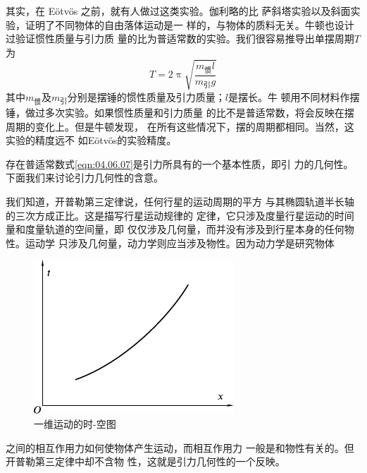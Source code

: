 其实，在 E\"otv\"os 之前，就有人做过这类实验。伽利略的比
萨斜塔实验以及斜面实验，证明了不同物体的自由落体运动是一
样的，与物体的质料无关。牛顿也设计过验证惯性质量与引力质
量的比为普适常数的实验。我们很容易推导出单摆周期$ T $为
\begin{equation*}
  T = 2 \uppi \sqrt{\frac { m _ {\text{惯}} l } { m _ {\text{引}} g }}
\end{equation*}
其中$ m _ {\text{惯}} $及$ m _ {\text{引}} $分别是摆锤的惯性质量及引力质量；$ l $是摆长。牛
顿用不同材料作摆锤，做过多次实验。如果惯性质量和引力质量
的比不是普适常数，将会反映在摆周期的变化上。但是牛顿发现，
在所有这些情况下，摆的周期都相同。当然，这实验的精度远不
如E\"otv\"os的实验精度。

存在普适常数式\eqref{eqn:04.06.07}是引力所具有的一个基本性质，即引
力的几何性。下面我们来讨论引力几何性的含意。

我们知道，开普勒第三定律说，任何行星的运动周期的平方
与其椭圆轨道半长轴的三次方成正比。这是描写行星运动规律的
定律，它只涉及度量行星运动的时间量和度量轨道的空间量，即
仅仅涉及几何量，而并没有涉及到行星本身的任何物性。运动学
只涉及几何量，动力学则应当涉及物性。因为动力学是研究物体
\begin{figure}
  \centering
  \includegraphics{figure/fig04.06}
  \caption{一维运动的时-空图}
  \label{fig:04.06}
\end{figure}
之间的相互作用力如何使物体产生运动，而相互作用力
一般是和物性有关的。但开普勒第三定律中却不含物
性，这就是引力几何性的一个反映。

